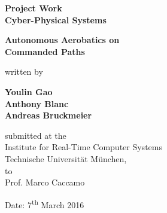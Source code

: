 \documentclass[11pt,a4paper]{scrartcl}		%
\begin{document}

\begin{titlepage}
	
	\singlespacing
	\begin{center}
	
		\quad
		\vspace{1cm}
	
		\Large{\textbf{Project Work\\Cyber-Physical Systems}}
	
		\vspace{1.5cm}
	
		\huge{\textbf{Autonomous Aerobatics on\\Commanded Paths}}
	
		\vspace{1.5cm}
	
		written by
		
		\vspace{1.5cm}
	
		\Large{\textbf{Youlin Gao\\Anthony Blanc\\Andreas Bruckmeier}}
	
		\vfill
		
		submitted at the\\
		Institute for Real-Time Computer Systems\\
		Technische Universität München,\\
		to\\
		Prof. Marco Caccamo

		\vspace{1cm}		
		
		Date: 7\textsuperscript{th} March 2016
	
	\end{center}
	
\end{titlepage}



\newpage
\tableofcontents	

\vfill


\listoffigures
\end{document}
